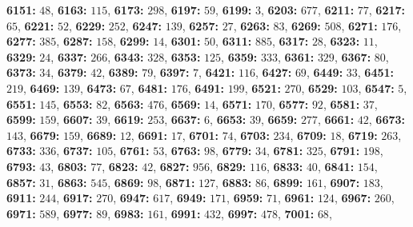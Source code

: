 \textsf{\bfseries 6151:} $48$, \textsf{\bfseries 6163:} $115$, \textsf{\bfseries 6173:} $298$, \textsf{\bfseries 6197:} $59$, \textsf{\bfseries 6199:} $3$, \textsf{\bfseries 6203:} $677$, \textsf{\bfseries 6211:} $77$, \textsf{\bfseries 6217:} $65$, \textsf{\bfseries 6221:} $52$, \textsf{\bfseries 6229:} $252$, \textsf{\bfseries 6247:} $139$, \textsf{\bfseries 6257:} $27$, \textsf{\bfseries 6263:} $83$, \textsf{\bfseries 6269:} $508$, \textsf{\bfseries 6271:} $176$, \textsf{\bfseries 6277:} $385$, \textsf{\bfseries 6287:} $158$, \textsf{\bfseries 6299:} $14$, \textsf{\bfseries 6301:} $50$, \textsf{\bfseries 6311:} $885$, \textsf{\bfseries 6317:} $28$, \textsf{\bfseries 6323:} $11$, \textsf{\bfseries 6329:} $24$, \textsf{\bfseries 6337:} $266$, \textsf{\bfseries 6343:} $328$, \textsf{\bfseries 6353:} $125$, \textsf{\bfseries 6359:} $333$, \textsf{\bfseries 6361:} $329$, \textsf{\bfseries 6367:} $80$, \textsf{\bfseries 6373:} $34$, \textsf{\bfseries 6379:} $42$, \textsf{\bfseries 6389:} $79$, \textsf{\bfseries 6397:} $7$, \textsf{\bfseries 6421:} $116$, \textsf{\bfseries 6427:} $69$, \textsf{\bfseries 6449:} $33$, \textsf{\bfseries 6451:} $219$, \textsf{\bfseries 6469:} $139$, \textsf{\bfseries 6473:} $67$, \textsf{\bfseries 6481:} $176$, \textsf{\bfseries 6491:} $199$, \textsf{\bfseries 6521:} $270$, \textsf{\bfseries 6529:} $103$, \textsf{\bfseries 6547:} $5$, \textsf{\bfseries 6551:} $145$, \textsf{\bfseries 6553:} $82$, \textsf{\bfseries 6563:} $476$, \textsf{\bfseries 6569:} $14$, \textsf{\bfseries 6571:} $170$, \textsf{\bfseries 6577:} $92$, \textsf{\bfseries 6581:} $37$, \textsf{\bfseries 6599:} $159$, \textsf{\bfseries 6607:} $39$, \textsf{\bfseries 6619:} $253$, \textsf{\bfseries 6637:} $6$, \textsf{\bfseries 6653:} $39$, \textsf{\bfseries 6659:} $277$, \textsf{\bfseries 6661:} $42$, \textsf{\bfseries 6673:} $143$, \textsf{\bfseries 6679:} $159$, \textsf{\bfseries 6689:} $12$, \textsf{\bfseries 6691:} $17$, \textsf{\bfseries 6701:} $74$, \textsf{\bfseries 6703:} $234$, \textsf{\bfseries 6709:} $18$, \textsf{\bfseries 6719:} $263$, \textsf{\bfseries 6733:} $336$, \textsf{\bfseries 6737:} $105$, \textsf{\bfseries 6761:} $53$, \textsf{\bfseries 6763:} $98$, \textsf{\bfseries 6779:} $34$, \textsf{\bfseries 6781:} $325$, \textsf{\bfseries 6791:} $198$, \textsf{\bfseries 6793:} $43$, \textsf{\bfseries 6803:} $77$, \textsf{\bfseries 6823:} $42$, \textsf{\bfseries 6827:} $956$, \textsf{\bfseries 6829:} $116$, \textsf{\bfseries 6833:} $40$, \textsf{\bfseries 6841:} $154$, \textsf{\bfseries 6857:} $31$, \textsf{\bfseries 6863:} $545$, \textsf{\bfseries 6869:} $98$, \textsf{\bfseries 6871:} $127$, \textsf{\bfseries 6883:} $86$, \textsf{\bfseries 6899:} $161$, \textsf{\bfseries 6907:} $183$, \textsf{\bfseries 6911:} $244$, \textsf{\bfseries 6917:} $270$, \textsf{\bfseries 6947:} $617$, \textsf{\bfseries 6949:} $171$, \textsf{\bfseries 6959:} $71$, \textsf{\bfseries 6961:} $124$, \textsf{\bfseries 6967:} $260$, \textsf{\bfseries 6971:} $589$, \textsf{\bfseries 6977:} $89$, \textsf{\bfseries 6983:} $161$, \textsf{\bfseries 6991:} $432$, \textsf{\bfseries 6997:} $478$, \textsf{\bfseries 7001:} $68$, 
